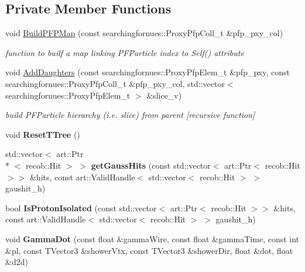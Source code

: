 \subsection*{Private Member Functions}
\begin{DoxyCompactItemize}
\item 
void \hyperlink{classSecondShowerPurity_a740e87a9a228f255bca15d2f04505aa9}{Build\-P\-F\-P\-Map} (const searchingfornues\-::\-Proxy\-Pfp\-Coll\-\_\-t \&pfp\-\_\-pxy\-\_\-col)
\begin{DoxyCompactList}\small\item\em function to builf a map linking P\-F\-Particle index to Self() attribute \end{DoxyCompactList}\item 
void \hyperlink{classSecondShowerPurity_a91a362195490bc158713e4ed84ed0fa2}{Add\-Daughters} (const searchingfornues\-::\-Proxy\-Pfp\-Elem\-\_\-t \&pfp\-\_\-pxy, const searchingfornues\-::\-Proxy\-Pfp\-Coll\-\_\-t \&pfp\-\_\-pxy\-\_\-col, std\-::vector$<$ searchingfornues\-::\-Proxy\-Pfp\-Elem\-\_\-t $>$ \&slice\-\_\-v)
\begin{DoxyCompactList}\small\item\em build P\-F\-Particle hierarchy (i.\-e. slice) from parent \mbox{[}recursive function\mbox{]} \end{DoxyCompactList}\item 
\hypertarget{classSecondShowerPurity_af58098493a2cd9014e1e962b366008e3}{void {\bfseries Reset\-T\-Tree} ()}\label{classSecondShowerPurity_af58098493a2cd9014e1e962b366008e3}

\item 
\hypertarget{classSecondShowerPurity_ad2c997fc6ccdea277c14cfcad5c83243}{std\-::vector$<$ art\-::\-Ptr\\*
$<$ recob\-::\-Hit $>$ $>$ {\bfseries get\-Gauss\-Hits} (const std\-::vector$<$ art\-::\-Ptr$<$ recob\-::\-Hit $>$$>$ \&hits, const art\-::\-Valid\-Handle$<$ std\-::vector$<$ recob\-::\-Hit $>$ $>$ gaushit\-\_\-h)}\label{classSecondShowerPurity_ad2c997fc6ccdea277c14cfcad5c83243}

\item 
\hypertarget{classSecondShowerPurity_aca45d8671bf9d292eed1ed00a80329b1}{bool {\bfseries Is\-Proton\-Isolated} (const std\-::vector$<$ art\-::\-Ptr$<$ recob\-::\-Hit $>$$>$ \&hits, const art\-::\-Valid\-Handle$<$ std\-::vector$<$ recob\-::\-Hit $>$ $>$ gaushit\-\_\-h)}\label{classSecondShowerPurity_aca45d8671bf9d292eed1ed00a80329b1}

\item 
\hypertarget{classSecondShowerPurity_ac3aa736b52623968b984814ac75d6510}{void {\bfseries Gamma\-Dot} (const float \&gamma\-Wire, const float \&gamma\-Time, const int \&pl, const T\-Vector3 \&shower\-Vtx, const T\-Vector3 \&shower\-Dir, float \&dot, float \&d2d)}\label{classSecondShowerPurity_ac3aa736b52623968b984814ac75d6510}


\end{DoxyCompactItemize}
